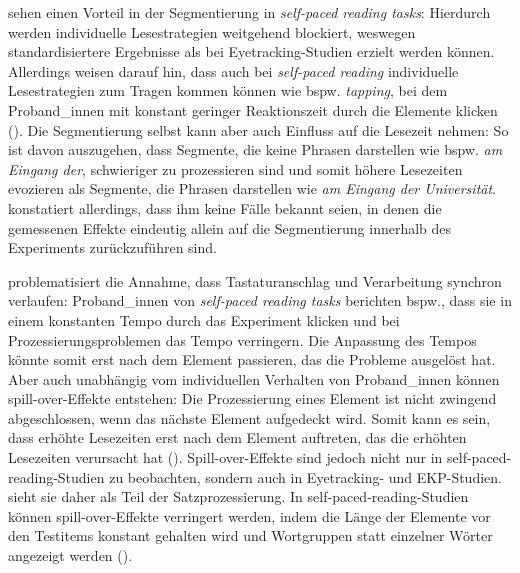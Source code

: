  \textcite[107--108]{Witzel.2012} sehen einen Vorteil in der Segmentierung in \textit{self-paced reading tasks}: Hierdurch werden individuelle Lesestrategien weitgehend blockiert, weswegen standardisiertere Ergebnisse als bei Eyetracking-Studien erzielt werden können. Allerdings weisen \textcite[107--108]{Witzel.2012} darauf hin, dass auch bei \textit{self-paced reading} individuelle Lesestrategien zum Tragen kommen können wie bspw. \textit{tapping}, bei dem Proband\_innen mit konstant geringer Reaktionszeit durch die Elemente klicken (\cite[349]{Forster.2010}). Die Segmentierung selbst kann aber auch Einfluss auf die Lesezeit nehmen: So ist davon auszugehen, dass Segmente, die keine Phrasen darstellen wie bspw. \textit{am Eingang der}, schwieriger zu prozessieren sind und somit höhere Lesezeiten evozieren als Segmente, die Phrasen darstellen wie \textit{am Eingang der Universität}. \textcite[25--26]{Mitchel.2013} konstatiert allerdings, dass ihm keine Fälle bekannt seien, in denen die gemessenen Effekte eindeutig allein auf die Segmentierung innerhalb des Experiments zurückzuführen sind. 



\textcite[349]{Forster.2010} problematisiert die Annahme, dass Tastaturanschlag und Verarbeitung synchron verlaufen: Proband\_innen von \textit{self-paced reading tasks} berichten bspw., dass sie in einem konstanten Tempo durch das Experiment klicken und bei Prozessierungsproblemen das Tempo verringern. Die Anpassung des Tempos könnte somit erst nach dem Element passieren, das die Probleme ausgelöst hat. Aber auch unabhängig vom individuellen Verhalten von Pro\-\mbox{band\_in}\-nen können  spill-over-Effekte entstehen: Die Prozessierung eines Element ist nicht zwingend abgeschlossen, wenn das nächste Element aufgedeckt wird. Somit kann es sein, dass erhöhte Lesezeiten erst nach dem Element auftreten, das die erhöhten Lesezeiten verursacht hat (\cite[24--25]{Mitchel.2013}). Spill-over-Effekte sind jedoch nicht nur in self-paced-reading-Studien zu beobachten, sondern auch in Eyetracking- und EKP-Studien. \textcite[25]{Mitchel.2013} sieht sie daher als Teil der Satzprozessierung. In self-paced-reading-Studien können spill-over-Effekte verringert werden, indem die Länge der Elemente vor den Testitems konstant gehalten wird und Wortgruppen statt einzelner Wörter angezeigt werden (\cite[25]{Mitchel.2013}).   

